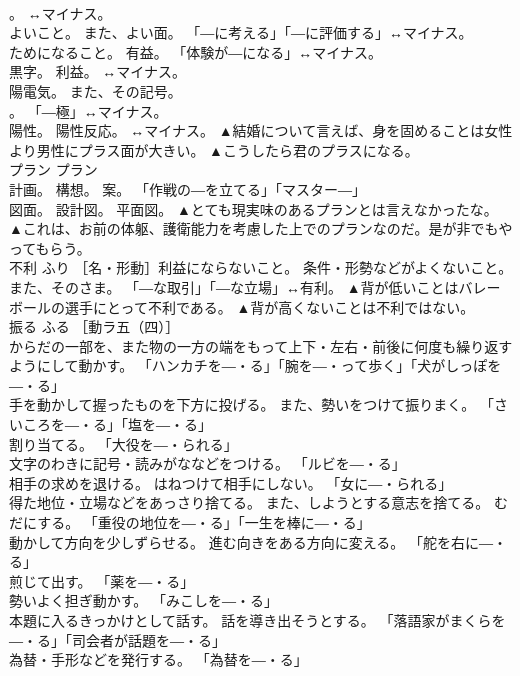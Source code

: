 \documentclass[8pt]{extreport}
\begin{document}
\begin{CJK}{UTF8}{min}
\\	。 ↔マイナス。 
\\	よいこと。 また、よい面。 「―に考える」「―に評価する」↔マイナス。 
\\	ためになること。 有益。 「体験が―になる」↔マイナス。 
\\	黒字。 利益。 ↔マイナス。 
\\	陽電気。 また、その記号。 
\\	。 「―極」↔マイナス。 
\\	陽性。 陽性反応。 ↔マイナス。	▲結婚について言えば、身を固めることは女性より男性にプラス面が大きい。 ▲こうしたら君のプラスになる。
\\	プラン	プラン	
\\	計画。 構想。 案。 「作戦の―を立てる」「マスター―」 
\\	図面。 設計図。 平面図。	▲とても現実味のあるプランとは言えなかったな。 ▲これは、お前の体躯、護衛能力を考慮した上でのプランなのだ。是が非でもやってもらう。
\\	不利	ふり	［名・形動］利益にならないこと。 条件・形勢などがよくないこと。 また、そのさま。 「―な取引」「―な立場」↔有利。	▲背が低いことはバレーボールの選手にとって不利である。 ▲背が高くないことは不利ではない。
\\	振る	ふる	［動ラ五（四）］ 
\\	からだの一部を、また物の一方の端をもって上下・左右・前後に何度も繰り返すようにして動かす。 「ハンカチを―・る」「腕を―・って歩く」「犬がしっぽを―・る」 
\\	手を動かして握ったものを下方に投げる。 また、勢いをつけて振りまく。 「さいころを―・る」「塩を―・る」 
\\	割り当てる。 「大役を―・られる」 
\\	文字のわきに記号・読みがななどをつける。 「ルビを―・る」 
\\	相手の求めを退ける。 はねつけて相手にしない。 「女に―・られる」 
\\	得た地位・立場などをあっさり捨てる。 また、しようとする意志を捨てる。 むだにする。 「重役の地位を―・る」「一生を棒に―・る」 
\\	動かして方向を少しずらせる。 進む向きをある方向に変える。 「舵を右に―・る」 
\\	煎じて出す。 「薬を―・る」 
\\	勢いよく担ぎ動かす。 「みこしを―・る」 
\\	本題に入るきっかけとして話す。 話を導き出そうとする。 「落語家がまくらを―・る」「司会者が話題を―・る」 
\\	為替・手形などを発行する。 「為替を―・る」 

\end{CJK}
\end{document}
